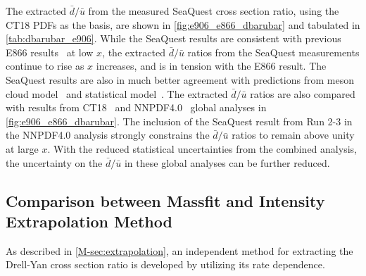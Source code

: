 \documentclass[../main.tex]{subfiles}
\begin{document}
The extracted $\bar{d}/\bar{u}$ from the measured SeaQuest cross section ratio,
using the CT18 PDFs as the basis, are shown in \cref{fig:e906_e866_dbarubar} 
and tabulated in \cref{tab:dbarubar_e906}. 
While the SeaQuest results are consistent with previous E866 results~\cite{towell2001} at low $x$,
the extracted $\bar{d}/\bar{u}$ ratios from the SeaQuest measurements continue to rise as $x$ increases,
and is in tension with the E866 result.
The SeaQuest results are also in much better agreement with predictions from meson cloud model~\cite{alberg2022}
and statistical model~\cite{soffer2019}.
The extracted $\bar{d}/\bar{u}$ ratios are also compared with results from CT18~\cite{hou2021} and NNPDF4.0~\cite{ball2022a}
global analyses in \cref{fig:e906_e866_dbarubar}. 
The inclusion of the SeaQuest result from Run 2-3 in the NNPDF4.0 analysis strongly constrains the $\bar{d}/\bar{u}$ ratios
to remain above unity at large $x$.
With the reduced statistical uncertainties from the combined analysis,
the uncertainty on the $\bar{d}/\bar{u}$ in these global analyses can be further reduced.
\begin{comment}
The impact of the SeaQuest measurement is further illustrated in \cref{fig:JAM_impact}. 
The JAM analysis~\cite{cocuzza2021} found that the SeaQuest measurement greatly reduces the 
uncertainties on the $\bar{d}/\bar{u}$ ratio, by up to $\approx 50\%$ at $x>0.3$. 
The addition of the SeaQuest data also constrain the ratio to remain above unity up to values of $x\approx0.4$,
which is also in better agreement with prediction from various models, including meson-cloud and statistical model.
\begin{figure}[h!]
	\centering
	\texttt{[image: JAM\_impact]}
	\caption{impact on the $\bar{d}/\bar{u}$ ratio (top) and the asymmetry $x\left(\bar{d}-\bar{u}\right)$ (middle)
		of the SeaQuest measurement (red band) and STAR $W$ data \cite{adam2021} (blue band) relative to the baseline (green band) 
		where the SeaQuest and STAR measurements are excluded in the JAM analysis~\cite{cocuzza2021}.
		The uncertainty on $\bar{d}/\bar{u}$ for these two scenarios normalized to that of the baseline
		are shown in the bottom panel. Taken from Ref.~\cite{cocuzza2021}.}
	\label{fig:JAM_impact}
\end{figure}
\end{comment}

\subsection{Comparison between Massfit and Intensity Extrapolation Method}
As described in \cref{M-sec:extrapolation}, an independent method for extracting the Drell-Yan cross section
ratio is developed by utilizing its rate dependence. 
\end{document}
